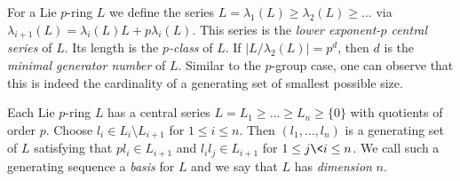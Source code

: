 For a Lie $p$-ring $L$ we define the series $L = \lambda_1(L) \geq 
\lambda_2(L) \geq \ldots$ 
via $\lambda_{i+1}(L) = \lambda_i(L) L + p \lambda_i(L)$. This 
series is the {\it lower exponent-$p$ central series} of $L$. Its length 
is the {\it $p$-class} of $L$. If $|L/\lambda_2(L)| = p^d$, then $d$ is 
the {\it minimal generator number} of $L$. Similar to the $p$-group case, 
one can observe that this is indeed the cardinality of a generating set 
of smallest possible size.
\medskip

Each Lie $p$-ring $L$ has a central series $L = L_1 \geq \ldots \geq L_n 
\geq \{0\}$ with quotients of order $p$. Choose $l_i \in L_i \setminus 
L_{i+1}$ for $1 \leq i \leq n$. Then $(l_1, \ldots, l_n)$ is a generating 
set of $L$ satisfying that $p l_i \in L_{i+1}$ and $l_i l_j 
\in L_{i+1}$ for $1 \leq j \< i \leq n$. We call such a generating sequence 
a {\it basis} for $L$ and we say that $L$ has {\it dimension} $n$.


